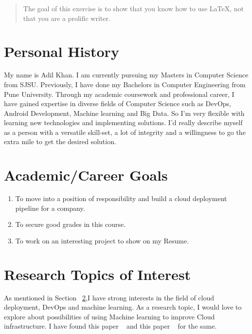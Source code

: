 \documentclass{article}
\begin{document}
\begin{abstract}
The goal of this exercise is to show that you know how to use LaTeX, not that you are a prolific writer.
\end{abstract}

\section{Personal History}

My name is Adil Khan. I am currently pursuing my Masters in Computer Science from SJSU. Previously, I have done my Bachelors in Computer Engineering from Pune University. Through my academic coursework and professional career, I have gained expertise in diverse fields of Computer Science such as DevOps, Android Development, Machine learning and Big Data. So I’m very flexible with learning new technologies and implementing solutions.
I'd really describe myself as a person with a versatile skill-set, a lot of integrity and a willingness to go the extra mile to get the desired solution.

\section{Academic/Career Goals}
\label{sec:one}

\begin{enumerate}
\item To move into a position of responsibility and build a cloud deployment pipeline for a company.
\item To secure good grades in this course.
\item To work on an interesting project to show on my Resume.
\end{enumerate}

\section{Research Topics of Interest}
As mentioned in Section ~\ref{sec:one},I have strong interests in the field of cloud deployment, DevOps and machine learning. 
As a research topic, I would love to explore about possibilities of using Machine learning to improve Cloud infrastructure.
I have found this paper ~\cite{DBLP:conf/ccs/GulmezogluES17} and this paper ~\cite{DBLP:conf/cscloud/SalmanBEJS17} for the same.

{}

\end{document}
